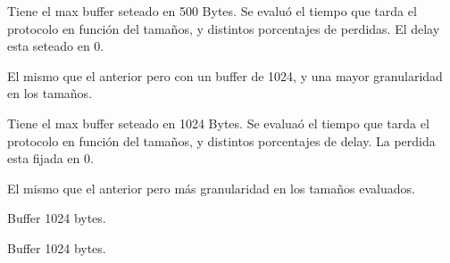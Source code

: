 Tiene el max buffer seteado en 500 Bytes. Se evalu\'o el tiempo que tarda el protocolo en funci\'on del tama\~nos, y distintos porcentajes de perdidas. El delay esta seteado en 0. 

El mismo que el anterior pero con un buffer de 1024, y una mayor granularidad en los tama\~nos.

Tiene el max buffer seteado en 1024 Bytes. Se evalua\'o el tiempo que tarda el protocolo en funci\'on del tama\~nos, y distintos porcentajes de delay. La perdida esta fijada en 0. 

El mismo que el anterior pero m\'as granularidad en los tama\~nos evaluados.

Buffer 1024 bytes. 

Buffer 1024 bytes.
